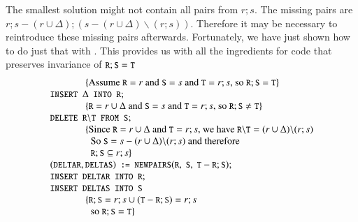 \documentclass{elsarticle}
\begin{document}
	The smallest solution might not contain all pairs from $r;s$.
	The missing pairs are $r;s-(r\cup\Delta);(s-(r\cup \Delta)\backslash(r;s))$.
	Therefore it may be necessary to reintroduce these missing pairs afterwards.
	Fortunately, we have just shown how to do just that with .
	This provides us with all the ingredients for code that preserves invariance of $\text{\tt\small R};\text{\tt\small S}=\text{\tt\small T}$
\[\begin{array}{l}
\hspace{0.5in}\{\text{Assume }\code{R}=r\text{ and }\code{S}=s\text{ and }\code{T}=r;s\text{, so }\code{R};\code{S}=\code{T}\}\\
\code{INSERT }\Delta\code{ INTO R};\\
\hspace{0.5in}\{\code{R}=r\cup\Delta\text{ and }\code{S}=s\text{ and }\code{T}=r;s\text{, so }\code{R};\code{S}\neq\code{T}\}\\
\code{DELETE R}\backslash\code{T FROM S};\\
\hspace{0.5in}\{\text{Since }\code{R}=r\cup\Delta\text{ and }\code{T}=r;s\text{, we have }\code{R}\backslash\code{T}=(r\cup \Delta)\backslash(r;s)\\
\hspace{0.575in}\text{So }\code{S}=s-(r\cup \Delta)\backslash(r;s)\text{ and therefore}\\
\hspace{0.575in}\code{R};\code{S}\subs r;s\}\\
(\code{DELTAR},\code{DELTAS})\code{ := }\code{NEWPAIRS}(\code{R},\ \code{S},\ \code{T}-\code{R};\code{S});\\
\code{INSERT DELTAR INTO R};\\
\code{INSERT DELTAS INTO S}\\
\hspace{0.5in}\{\code{R};\code{S}=r;s\cup(\code{T}-\code{R};\code{S})=r;s\\
\hspace{0.575in}\text{so }\code{R};\code{S}=\code{T}\}
\end{array}\]
\end{document}
